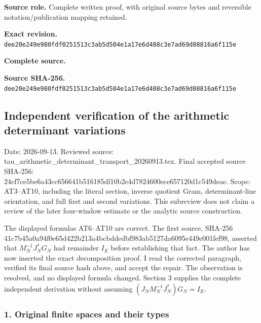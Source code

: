 \documentclass{article}
\begin{document}
\maketitle
\begingroup
\sloppy
\small

\noindent\textbf{Source role.} Complete written proof, with original source bytes and reversible notation/publication mapping retained.\par
\noindent\textbf{Exact revision.} \nolinkurl{dee20e249e980fdf0251513c3ab5d504e1a17e6d408c3e7ad69d08816a6f115e}\par
\noindent\textbf{Complete source.} \par
\noindent\textbf{Source SHA-256.} \nolinkurl{dee20e249e980fdf0251513c3ab5d504e1a17e6d408c3e7ad69d08816a6f115e}\par\medskip
\subsection{Independent verification of the arithmetic determinant variations}\label{endpoint-variation_review--independent-verification-of-the-arithmetic-determinant-variations}

Date: 2026-09-13. Reviewed source: tau\_arithmetic\_determinant\_transport\_20260913.tex. Final accepted source SHA-256: 24cf7ce5be6a43cc656641b516185df10b2e4d7824600ece657120d1c549deae. Scope: AT3--AT10, including the literal section, inverse quotient Gram, determinant-line orientation, and full first and second variations. This subreview does not claim a review of the later four-window estimate or the analytic source construction.

The displayed formulas AT6--AT10 are correct. The first source, SHA-256 41c7b45a0a94f0e65d422b213a4bcbddedbf983ab5127da6095e449e001fef98, asserted that \(M_N^{-1}J_N^*G_N\) had remainder \(I_E\) before establishing that fact. The author has now inserted the exact decomposition proof. I read the corrected paragraph, verified its final source hash above, and accept the repair. The observation is resolved, and no displayed formula changed. Section 3 supplies the complete independent derivation without assuming \((J_NM_N^{-1}J_N^*)G_N=I_E\).

\subsubsection{1. Original finite spaces and their types}\label{endpoint-variation_review--original-finite-spaces-and-their-types}
\end{document}
